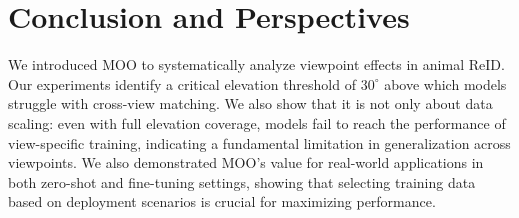 \section{Conclusion and Perspectives}
\label{sec:conclusion}

We introduced MOO to systematically analyze viewpoint effects in animal ReID.
Our experiments identify a critical elevation threshold of $30^\circ$ above which models struggle with cross-view matching. %
We also show that it is not only about data scaling: even with full elevation coverage, models fail to reach the performance of view-specific training, indicating a fundamental limitation in generalization across viewpoints.
We also demonstrated MOO's value for real-world applications in both zero-shot and fine-tuning settings, showing that selecting training data based on deployment scenarios is crucial for maximizing performance.
